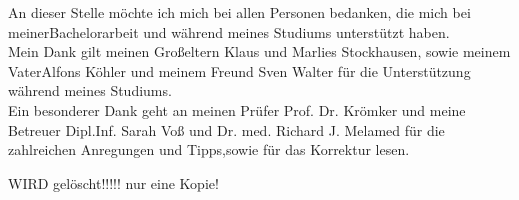 \label{cha:danksagung}
An  dieser Stelle möchte ich mich bei allen Personen bedanken, die mich  bei  meinerBachelorarbeit und während meines Studiums  unterstützt haben.\\
Mein Dank gilt meinen Großeltern Klaus und Marlies Stockhausen, sowie meinem VaterAlfons Köhler und meinem Freund Sven Walter für die Unterstützung während meines Studiums. \\
Ein besonderer Dank geht an meinen Prüfer Prof. Dr. Krömker und meine Betreuer Dipl.Inf. Sarah Voß und Dr. med. Richard J. Melamed für die zahlreichen Anregungen und Tipps,sowie für das Korrektur lesen.


WIRD gelöscht!!!!! nur eine Kopie!

